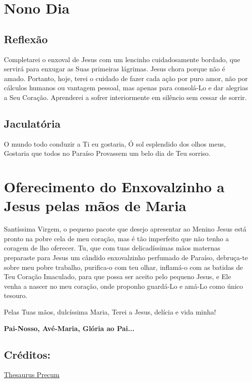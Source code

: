 \documentclass[11pt]{article}
\begin{document}
\section{Nono Dia}
\subsection{Reflexão}
Completarei o enxoval de Jesus com um lencinho cuidadosamente bordado, que servirá para enxugar as Suas primeiras lágrimas. Jesus chora porque não é amado. Portanto, hoje, terei o cuidado de fazer cada ação por puro amor, não por cálculos humanos ou vantagem pessoal, mas apenas para consolá-Lo e dar alegrias a Seu Coração. Aprenderei a sofrer interiormente em silêncio sem cessar de sorrir.

\subsection{Jaculatória}
O mundo todo conduzir a Ti eu gostaria,
Ó sol esplendido dos olhos meus,
Gostaria que todos no Paraíso
Provassem um belo dia de Teu sorriso.


\section{Oferecimento do Enxovalzinho a Jesus pelas mãos de Maria}
Santíssima Virgem, o pequeno pacote que desejo apresentar ao Menino Jesus está pronto na pobre cela de meu coração, mas é tão imperfeito que não tenho a coragem de lho oferecer. Tu, que com tuas delicadíssimas mãos maternas preparaste para Jesus um cândido enxovalzinho perfumado de Paraíso, debruça-te sobre meu pobre trabalho, purifica-o com teu olhar, inflamá-o com as batidas de Teu Coração Imaculado, para que possa ser aceito pelo pequeno Jesus, e Ele venha a nascer no meu coração, onde proponho guardá-Lo e amá-Lo como único tesouro. 


Pelas Tuas mãos, dulcíssima Maria,
Terei a Jesus, delícia e vida minha!

\textbf{Pai-Nosso, Avé-Maria, Glória ao Pai... }

\subsection*{Créditos:}
\href{https://precantur.blogspot.com/2011/12/novena-do-enxovalzinho-do-menino-jesus.html}{Thesaurus Precum}
\end{document}
